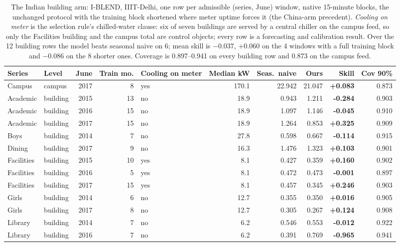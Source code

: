 \begin{table}[t]
\centering
\footnotesize
\setlength{\tabcolsep}{3.5pt}
\begin{tabular}{llrrlrrrrr}
\toprule
Series & Level & June & Train mo. & Cooling on meter & Median kW & Seas.\ naive & Ours & Skill & Cov 90\% \\
\midrule
Campus & campus & 2017 & 8 & yes & 170.1 & 22.942 & 21.047 & \textbf{+0.083} & 0.873 \\
Academic & building & 2015 & 13 & no & 18.9 & 0.943 & 1.211 & \textbf{-0.284} & 0.903 \\
Academic & building & 2016 & 15 & no & 18.9 & 1.097 & 1.146 & \textbf{-0.045} & 0.910 \\
Academic & building & 2017 & 15 & no & 18.9 & 1.264 & 0.853 & \textbf{+0.325} & 0.909 \\
Boys & building & 2014 & 7 & no & 27.8 & 0.598 & 0.667 & \textbf{-0.114} & 0.915 \\
Dining & building & 2017 & 9 & no & 16.3 & 1.476 & 1.323 & \textbf{+0.103} & 0.901 \\
Facilities & building & 2015 & 10 & yes & 8.1 & 0.427 & 0.359 & \textbf{+0.160} & 0.902 \\
Facilities & building & 2016 & 5 & yes & 8.1 & 0.472 & 0.473 & \textbf{-0.001} & 0.897 \\
Facilities & building & 2017 & 15 & yes & 8.1 & 0.457 & 0.345 & \textbf{+0.246} & 0.903 \\
Girls & building & 2014 & 6 & no & 12.7 & 0.355 & 0.350 & \textbf{+0.016} & 0.905 \\
Girls & building & 2017 & 8 & no & 12.7 & 0.305 & 0.267 & \textbf{+0.124} & 0.908 \\
Library & building & 2014 & 7 & no & 6.2 & 0.546 & 0.553 & \textbf{-0.012} & 0.922 \\
Library & building & 2016 & 7 & no & 6.2 & 0.391 & 0.769 & \textbf{-0.965} & 0.941 \\
\bottomrule
\end{tabular}
\caption{The Indian building arm: I-BLEND, IIIT-Delhi, one row per admissible (series, June) window, native 15-minute blocks, the unchanged protocol with the training block shortened where meter uptime forces it (the China-arm precedent). \emph{Cooling on meter} is the selection rule's chilled-water clause: six of seven buildings are served by a central chiller on the campus feed, so only the Facilities building and the campus total are control objects; every row is a forecasting and calibration result. Over the 12 building rows the model beats seasonal naive on 6; mean skill is $-0.037$, $+0.060$ on the 4 windows with a full training block and $-0.086$ on the 8 shorter ones. Coverage is 0.897--0.941 on every building row and 0.873 on the campus feed.}
\label{tab:iblend}
\end{table}
